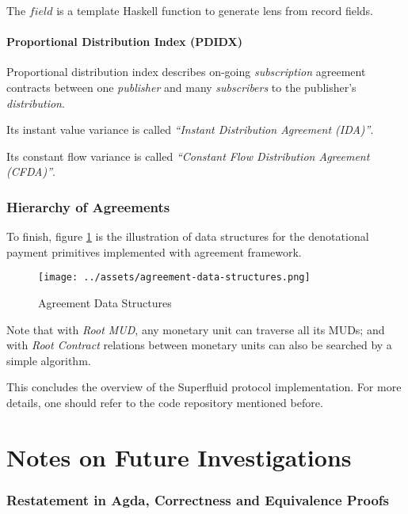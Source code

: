 The $field$ is a template Haskell function to generate lens from record fields.

\subsection{Proportional Distribution Index (PDIDX)}

Proportional distribution index describes on-going \textit{subscription} agreement contracts between
one \textit{publisher} and many \textit{subscribers} to the publisher's \textit{distribution}.

Its instant value variance is called \textit{``Instant Distribution Agreement (IDA)''}.

Its constant flow variance is called \textit{``Constant Flow Distribution Agreement (CFDA)''}.

\section{Hierarchy of Agreements}

To finish, figure \ref{fig:ac-agreement-data-structures} is the illustration of data structures for
the denotational payment primitives implemented with agreement framework.

\begin{figure}[H]
    \centering
    \texttt{[image: ../assets/agreement-data-structures.png]}
    \caption{Agreement Data Structures}
    \label{fig:ac-agreement-data-structures}
\end{figure}

Note that with \textit{Root MUD}, any monetary unit can traverse all its MUDs; and with \textit{Root
Contract} relations between monetary units can also be searched by a simple algorithm.

This concludes the overview of the Superfluid protocol implementation. For more details, one should
refer to the code repository mentioned before.

\part{Notes on Future Investigations}

\section{Restatement in Agda, Correctness and Equivalence Proofs}

